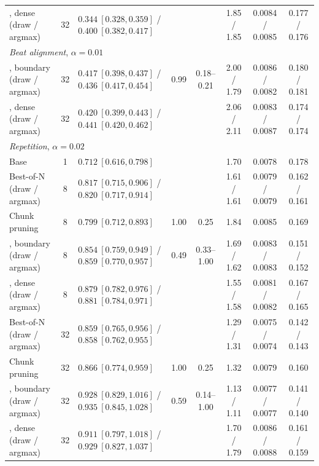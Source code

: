 \begin{table}[h]
\begin{center}
{\begin{tabular}{l c l c c ccc}
\method{}, dense (draw / argmax) & 32 & $0.344\ [0.328, 0.359]$ / $0.400\ [0.382, 0.417]$ & & & 1.85 / 1.85 & 0.0084 / 0.0085 & 0.177 / 0.176 \\
\multicolumn{8}{l}{\emph{Beat alignment}, $\alpha = 0.01$} \\
\method{}, boundary (draw / argmax) & 32 & $0.417\ [0.398, 0.437]$ / $0.436\ [0.417, 0.454]$ & 0.99 & 0.18--0.21 & 2.00 / 1.79 & 0.0086 / 0.0082 & 0.180 / 0.181 \\
\method{}, dense (draw / argmax) & 32 & $0.420\ [0.399, 0.443]$ / $0.441\ [0.420, 0.462]$ & & & 2.06 / 2.11 & 0.0083 / 0.0087 & 0.174 / 0.174 \\
\midrule
\multicolumn{8}{l}{\emph{Repetition}, $\alpha = 0.02$} \\
Base & 1 & $0.712\ [0.616, 0.798]$ & & & 1.70 & 0.0078 & 0.178 \\
Best-of-N (draw / argmax) & 8 & $0.817\ [0.715, 0.906]$ / $0.820\ [0.717, 0.914]$ & & & 1.61 / 1.61 & 0.0079 / 0.0079 & 0.162 / 0.161 \\
Chunk pruning & 8 & $0.799\ [0.712, 0.893]$ & 1.00 & 0.25 & 1.84 & 0.0085 & 0.169 \\
\method{}, boundary (draw / argmax) & 8 & $0.854\ [0.759, 0.949]$ / $0.859\ [0.770, 0.957]$ & 0.49 & 0.33--1.00 & 1.69 / 1.62 & 0.0083 / 0.0083 & 0.151 / 0.152 \\
\method{}, dense (draw / argmax) & 8 & $0.879\ [0.782, 0.976]$ / $0.881\ [0.784, 0.971]$ & & & 1.55 / 1.58 & 0.0081 / 0.0082 & 0.167 / 0.165 \\
Best-of-N (draw / argmax) & 32 & $0.859\ [0.765, 0.956]$ / $0.858\ [0.762, 0.955]$ & & & 1.29 / 1.31 & 0.0075 / 0.0074 & 0.142 / 0.143 \\
Chunk pruning & 32 & $0.866\ [0.774, 0.959]$ & 1.00 & 0.25 & 1.32 & 0.0079 & 0.160 \\
\method{}, boundary (draw / argmax) & 32 & $0.928\ [0.829, 1.016]$ / $0.935\ [0.845, 1.028]$ & 0.59 & 0.14--1.00 & 1.13 / 1.11 & 0.0077 / 0.0077 & 0.141 / 0.140 \\
\method{}, dense (draw / argmax) & 32 & $0.911\ [0.797, 1.018]$ / $0.929\ [0.827, 1.037]$ & & & 1.70 / 1.79 & 0.0086 / 0.0088 & 0.161 / 0.159 \\
\bottomrule
\end{tabular}}
\end{center}
\end{table}

